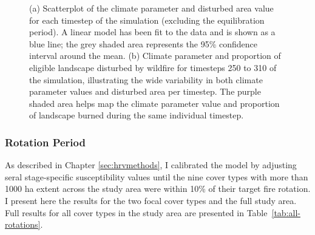 \begin{figure}[!htbp]
  \centering
  \caption{(a) Scatterplot of the climate parameter and disturbed area value for each timestep of the simulation (excluding the equilibration period). A linear model has been fit to the data and is shown as a blue line; the grey shaded area represents the 95\% confidence interval around the mean. (b) Climate parameter and proportion of eligible landscape disturbed by wildfire for timesteps 250 to 310 of the simulation, illustrating the wide variability in both climate parameter values and disturbed area per timestep. The purple shaded area helps map the climate parameter value and proportion of landscape burned during the same individual timestep.}
  \label{fig:climate_darea_combofig}
\end{figure}

\clearpage

\newpage
\subsubsection{Rotation Period} 
As described in Chapter \ref{sec:hrvmethods}, I calibrated the model by adjusting seral stage-specific susceptibility values until the nine cover types with more than 1000 ha extent across the study area were within 10\% of their target fire rotation. I present here the results for the two focal cover types and the full study area. Full results for all cover types in the study area are presented in Table~\ref{tab:all-rotations}. 

